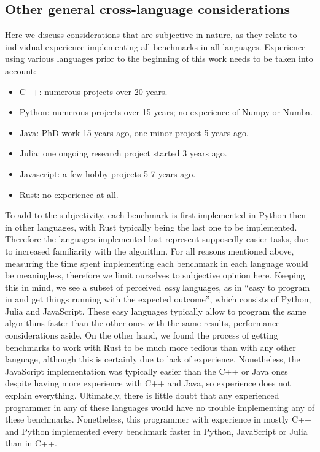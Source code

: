 \documentclass[11pt,a4paper,notitlepage]{article}
\begin{document}
\subsection{Other general cross-language considerations}
Here we discuss considerations that are subjective in nature, as they
relate to individual experience implementing all benchmarks in all
languages. Experience using various languages prior to the beginning
of this work needs to be taken into account:
\begin{itemize}
\item C++: numerous projects over 20 years.
\item Python: numerous projects over 15 years; no experience of Numpy
  or Numba.
\item Java: PhD work 15 years ago, one minor project 5 years ago.
\item Julia: one ongoing research project started 3 years ago.
\item Javascript: a few hobby projects 5-7 years ago.
\item Rust: no experience at all.
\end{itemize}
To add to the subjectivity, each benchmark is first implemented in
Python then in other languages, with Rust typically being the last one
to be implemented. Therefore the languages implemented last represent
supposedly easier tasks, due to increased familiarity with the
algorithm. For all reasons mentioned above, measuring the
time spent implementing each benchmark in each language would be
meaningless, therefore we limit ourselves to subjective opinion here.
Keeping this in mind, we see a subset of perceived
\emph{easy} languages, as in ``easy to program in and get things running
with the expected outcome'', which consists of Python, Julia and
JavaScript. These 
easy languages typically allow to program the same algorithms faster
than the other ones with the same results, performance considerations
aside.
On the other hand, we found the process of getting benchmarks to work
with Rust to be much more tedious than with any other language,
although this is certainly due to lack of experience. Nonetheless, the
JavaScript implementation was typically easier than the C++ or Java ones
despite having more experience with C++ and Java, so
experience does not explain everything.
Ultimately, there is little doubt that any experienced programmer in
any of these languages would have no trouble implementing any of these
benchmarks. Nonetheless, this programmer with experience in mostly C++
and Python implemented every benchmark faster in Python, JavaScript or Julia
than in C++.
\end{document}
